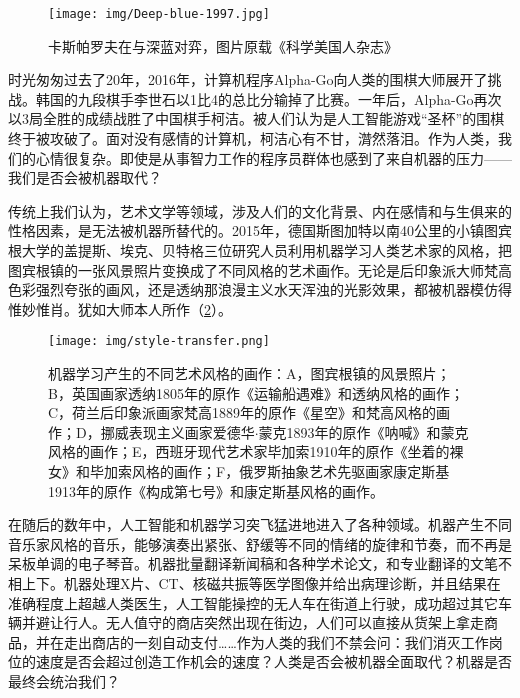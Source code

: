 \documentclass[b5paper]{ctexart}
\begin{document}
\begin{figure}[htbp]
 \centering
 \texttt{[image: img/Deep-blue-1997.jpg]}
 \caption{卡斯帕罗夫在与深蓝对弈，图片原载《科学美国人杂志》}
 \label{fig:Deep-blue-1997}
\end{figure}

时光匆匆过去了20年，2016年，计算机程序Alpha-Go向人类的围棋大师展开了挑战。韩国的九段棋手李世石以1比4的总比分输掉了比赛。一年后，Alpha-Go再次以3局全胜的成绩战胜了中国棋手柯洁。被人们认为是人工智能游戏“圣杯”的围棋终于被攻破了。面对没有感情的计算机，柯洁心有不甘，潸然落泪。作为人类，我们的心情很复杂。即使是从事智力工作的程序员群体也感到了来自机器的压力——我们是否会被机器取代？

传统上我们认为，艺术文学等领域，涉及人们的文化背景、内在感情和与生俱来的性格因素，是无法被机器所替代的。2015年，德国斯图加特以南40公里的小镇图宾根大学的盖提斯、埃克、贝特格三位研究人员利用机器学习人类艺术家的风格，把图宾根镇的一张风景照片变换成了不同风格的艺术画作\cite{Gatys-2015}。无论是后印象派大师梵高色彩强烈夸张的画风，还是透纳那浪漫主义水天浑浊的光影效果，都被机器模仿得惟妙惟肖。犹如大师本人所作（\cref{fig:style-transfer}）。

\begin{figure}[htbp]
 \centering
 \texttt{[image: img/style-transfer.png]}
 \caption{机器学习产生的不同艺术风格的画作：A，图宾根镇的风景照片；B，英国画家透纳1805年的原作《运输船遇难》和透纳风格的画作；C，荷兰后印象派画家梵高1889年的原作《星空》和梵高风格的画作；D，挪威表现主义画家爱德华$\cdot$蒙克1893年的原作《呐喊》和蒙克风格的画作；E，西班牙现代艺术家毕加索1910年的原作《坐着的裸女》和毕加索风格的画作；F，俄罗斯抽象艺术先驱画家康定斯基1913年的原作《构成第七号》和康定斯基风格的画作。}
 \label{fig:style-transfer}
\end{figure}

在随后的数年中，人工智能和机器学习突飞猛进地进入了各种领域。机器产生不同音乐家风格的音乐，能够演奏出紧张、舒缓等不同的情绪的旋律和节奏，而不再是呆板单调的电子琴音。机器批量翻译新闻稿和各种学术论文，和专业翻译的文笔不相上下。机器处理X片、CT、核磁共振等医学图像并给出病理诊断，并且结果在准确程度上超越人类医生，人工智能操控的无人车在街道上行驶，成功超过其它车辆并避让行人。无人值守的商店突然出现在街边，人们可以直接从货架上拿走商品，并在走出商店的一刻自动支付……作为人类的我们不禁会问：我们消灭工作岗位的速度是否会超过创造工作机会的速度？人类是否会被机器全面取代？机器是否最终会统治我们？
\end{document}
